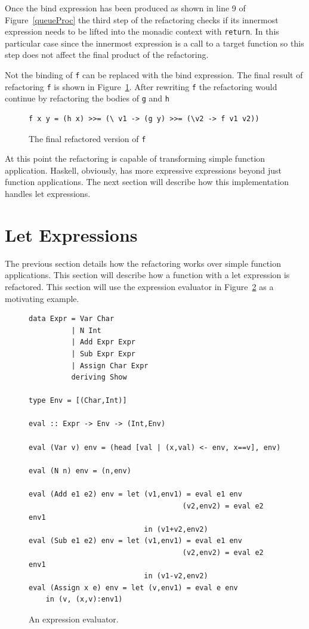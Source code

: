 Once the bind expression has been produced as shown in line 9 of Figure~\ref{queueProc} the third step of the refactoring checks if its innermost expression needs to be lifted into the monadic context with \texttt{return}. In this particular case since the innermost expression is a call to a target function so this step does not affect the final product of the refactoring.

Not the binding of \texttt{f} can be replaced with the bind expression. The final result of refactoring \texttt{f} is shown in Figure~\ref{simpF_ref}. After rewriting \texttt{f} the refactoring would continue by refactoring the bodies of \texttt{g} and \texttt{h}

\begin{figure}[t]
\begin{lstlisting}
f x y = (h x) >>= (\ v1 -> (g y) >>= (\v2 -> f v1 v2))
\end{lstlisting}
\caption{The final refactored version of \texttt{f}}
\label{simpF_ref}
\end{figure}

At this point the refactoring is capable of transforming simple function application. Haskell, obviously, has more expressive expressions beyond just function applications. The next section will describe how this implementation handles let expressions.

\section{Let Expressions}

The previous section details how the refactoring works over simple function applications. This section will describe how a function with a let expression is refactored. This section will use the expression evaluator in Figure~\ref{evalExpr} as a motivating example.

\begin{figure}[t]
\begin{lstlisting}
data Expr = Var Char
          | N Int
          | Add Expr Expr
          | Sub Expr Expr
          | Assign Char Expr
          deriving Show

type Env = [(Char,Int)]

eval :: Expr -> Env -> (Int,Env)

eval (Var v) env = (head [val | (x,val) <- env, x==v], env)

eval (N n) env = (n,env)

eval (Add e1 e2) env = let (v1,env1) = eval e1 env
                                    (v2,env2) = eval e2 env1 
                           in (v1+v2,env2)
eval (Sub e1 e2) env = let (v1,env1) = eval e1 env
                                    (v2,env2) = eval e2 env1 
                           in (v1-v2,env2)
eval (Assign x e) env = let (v,env1) = eval e env 
	in (v, (x,v):env1)
\end{lstlisting}
\caption{An expression evaluator.}
\label{evalExpr}
\end{figure}

